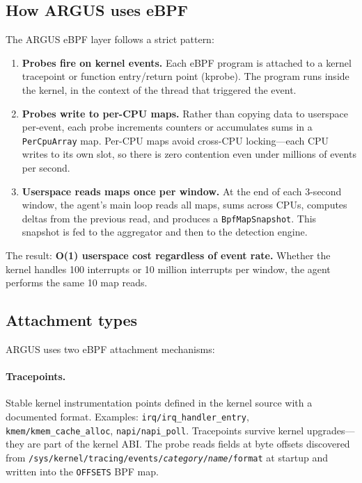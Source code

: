 \documentclass[11pt]{article}
\begin{document}
\subsection{How ARGUS uses eBPF}

The ARGUS eBPF layer follows a strict pattern:

\begin{enumerate}
  \item \textbf{Probes fire on kernel events.} Each eBPF program is attached
        to a kernel tracepoint or function entry/return point (kprobe).
        The program runs inside the kernel, in the context of the thread
        that triggered the event.
  \item \textbf{Probes write to per-CPU maps.} Rather than copying data to
        userspace per-event, each probe increments counters or accumulates
        sums in a \texttt{PerCpuArray} map. Per-CPU maps avoid cross-CPU
        locking---each CPU writes to its own slot, so there is zero
        contention even under millions of events per second.
  \item \textbf{Userspace reads maps once per window.} At the end of each
        3-second window, the agent's main loop reads all maps, sums across
        CPUs, computes deltas from the previous read, and produces a
        \texttt{BpfMapSnapshot}. This snapshot is fed to the aggregator and
        then to the detection engine.
\end{enumerate}

The result: \textbf{O(1) userspace cost regardless of event rate.} Whether
the kernel handles 100 interrupts or 10 million interrupts per window, the
agent performs the same 10 map reads.

\subsection{Attachment types}

ARGUS uses two eBPF attachment mechanisms:

\paragraph{Tracepoints.}
Stable kernel instrumentation points defined in the kernel source with a
documented format. Examples: \texttt{irq/irq\_handler\_entry},
\texttt{kmem/kmem\_cache\_alloc}, \texttt{napi/napi\_poll}. Tracepoints
survive kernel upgrades---they are part of the kernel ABI. The probe reads
fields at byte offsets discovered from
\texttt{/sys/kernel/tracing/events/\textit{category}/\textit{name}/format}
at startup and written into the \texttt{OFFSETS} BPF map.
\end{document}
